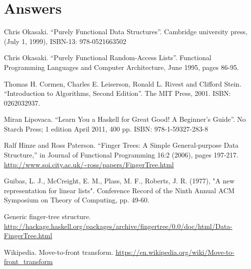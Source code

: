 \documentclass[b5paper]{article}
\begin{document}
\section{Answers}
\shipoutAnswer

\begin{thebibliography}{99}

Chris Okasaki. ``Purely Functional Data Structures''. Cambridge university press, (July 1, 1999), ISBN-13: 978-0521663502

Chris Okasaki. ``Purely Functional Random-Access Lists''. Functional Programming Languages and Computer Architecture, June 1995, pages 86-95.

Thomas H. Cormen, Charles E. Leiserson, Ronald L. Rivest and Clifford Stein. ``Introduction to Algorithms, Second Edition''. The MIT Press, 2001. ISBN: 0262032937.

Miran Lipovaca. ``Learn You a Haskell for Great Good! A Beginner's Guide''. No Starch Press; 1 edition April 2011, 400 pp. ISBN: 978-1-59327-283-8

Ralf Hinze and Ross Paterson. ``Finger Trees: A Simple General-purpose Data Structure,'' in Journal of Functional Programming 16:2 (2006), pages 197-217. \url{http://www.soi.city.ac.uk/~ross/papers/FingerTree.html}

Guibas, L. J., McCreight, E. M., Plass, M. F., Roberts, J. R. (1977), "A new representation for linear lists". Conference Record of the Ninth Annual ACM Symposium on Theory of Computing, pp. 49-60.

Generic finger-tree structure. \url{http://hackage.haskell.org/packages/archive/fingertree/0.0/doc/html/Data-FingerTree.html}

Wikipedia. Move-to-front transform. \url{https://en.wikipedia.org/wiki/Move-to-front_transform}

\end{thebibliography}

\expandafter\enddocument
\fi
\end{document}
